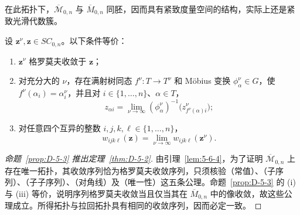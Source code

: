 在此拓扑下，$\overline{\mathcal M}_{0,n}$ 与 $\overline M_{0,n}$ 同胚，因而具有紧致度量空间的结构，实际上还是紧致光滑代数簇。

\begin{proposition}\label{prop:D-5-3}
设 $\mathbf z^\nu,\mathbf z\in SC_{0,n}$。以下条件等价：
\begin{enumerate}[label=(\roman*)]
\item $\mathbf z^\nu$ 格罗莫夫收敛于 $\mathbf z$；
\item 对充分大的 $\nu$，存在满射树同态 $f^\nu:T\to T^\nu$ 和 Möbius 变换 $\phi_\alpha^\nu\in G$，使 $f^\nu(\alpha_i)=\alpha_i^\nu$，并且对 $i\in\{1,\ldots,n\}$、$\alpha\in T$，
\begin{equation}\label{eq:D-5-1}
  z_{\alpha i}=\lim_{\nu\to\infty}(\phi_\alpha^\nu)^{-1}
  \bigl(z_{f^\nu(\alpha)i}^\nu\bigr);
\end{equation}
\item 对任意四个互异的整数 $i,j,k,\ell\in\{1,\ldots,n\}$，
\begin{equation}\label{eq:D-5-2}
  w_{ijk\ell}(\mathbf z)=\lim_{\nu\to\infty}w_{ijk\ell}(\mathbf z^\nu).
\end{equation}
\end{enumerate}
\end{proposition}

\begin{proof}[命题~\ref{prop:D-5-3} 推出定理~\ref{thm:D-5-2}]
由引理~\ref{lem:5-6-4}，为了证明 $\overline{\mathcal M}_{0,n}$ 上存在唯一拓扑，其收敛序列恰为格罗莫夫收敛序列，只须核验（常值）、（子序列）、（子子序列）、（对角线）及（唯一性）这五条公理。命题~\ref{prop:D-5-3} 的 (i) 与 (iii) 等价，说明序列格罗莫夫收敛当且仅当其在 $\overline M_{0,n}$ 中的像收敛，故这些公理成立。所得拓扑与拉回拓扑具有相同的收敛序列，因而必定一致。
\end{proof}

